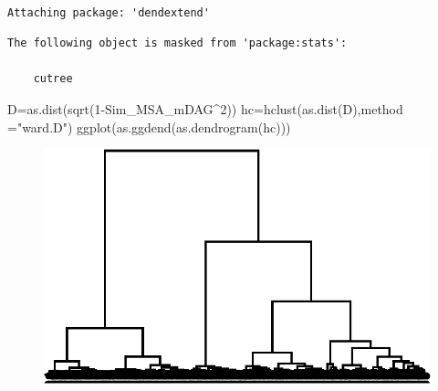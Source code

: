 \documentclass[
  letterpaper,
  DIV=11,
  numbers=noendperiod]{scrreprt}
\newenvironment{Shaded}{\begin{snugshade}}{\end{snugshade}}
\newcommand{\AttributeTok}[1]{\textcolor[rgb]{0.40,0.45,0.13}{#1}}
\newcommand{\DecValTok}[1]{\textcolor[rgb]{0.68,0.00,0.00}{#1}}
\newcommand{\FunctionTok}[1]{\textcolor[rgb]{0.28,0.35,0.67}{#1}}
\newcommand{\NormalTok}[1]{\textcolor[rgb]{0.00,0.23,0.31}{#1}}
\newcommand{\OtherTok}[1]{\textcolor[rgb]{0.00,0.23,0.31}{#1}}
\newcommand{\SpecialCharTok}[1]{\textcolor[rgb]{0.37,0.37,0.37}{#1}}
\newcommand{\StringTok}[1]{\textcolor[rgb]{0.13,0.47,0.30}{#1}}
\begin{document}
\begin{verbatim}

Attaching package: 'dendextend'
\end{verbatim}

\begin{verbatim}
The following object is masked from 'package:stats':

    cutree
\end{verbatim}

\begin{Shaded}
\begin{Highlighting}[]
\NormalTok{D}\OtherTok{=}\FunctionTok{as.dist}\NormalTok{(}\FunctionTok{sqrt}\NormalTok{(}\DecValTok{1}\SpecialCharTok{{-}}\NormalTok{Sim\_MSA\_mDAG}\SpecialCharTok{\^{}}\DecValTok{2}\NormalTok{))}
\NormalTok{hc}\OtherTok{=}\FunctionTok{hclust}\NormalTok{(}\FunctionTok{as.dist}\NormalTok{(D),}\AttributeTok{method =}\StringTok{"ward.D"}\NormalTok{)}
\FunctionTok{ggplot}\NormalTok{(}\FunctionTok{as.ggdend}\NormalTok{(}\FunctionTok{as.dendrogram}\NormalTok{(hc)))}
\end{Highlighting}
\end{Shaded}

\begin{figure}[H]

{\centering \includegraphics{./data_medag_20230321_long_report_files/figure-pdf/unnamed-chunk-13-1.pdf}

}

\end{figure}

\begin{Shaded}
\end{Shaded}
\end{document}
